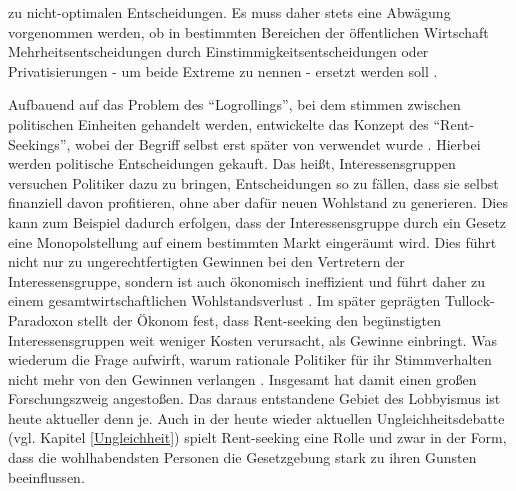 zu nicht-optimalen Entscheidungen. Es muss daher stets eine Abwägung vorgenommen werden, ob in bestimmten Bereichen der öffentlichen Wirtschaft Mehrheitsentscheidungen durch Einstimmigkeitsentscheidungen oder Privatisierungen - um beide Extreme zu nennen - ersetzt werden soll \parencite[S. 172]{Romer1988}.

Aufbauend auf das Problem des "`Logrollings"', bei dem stimmen zwischen politischen Einheiten gehandelt werden, entwickelte \textcite{Tullock1967} das Konzept des "`Rent-Seekings"', wobei der Begriff selbst erst später von \textcite{Krueger1974} verwendet wurde \parencite[S. 231]{Congleton2004}. Hierbei werden politische Entscheidungen gekauft. Das heißt, Interessensgruppen versuchen Politiker dazu zu bringen, Entscheidungen so zu fällen, dass sie selbst finanziell davon profitieren, ohne aber dafür neuen Wohlstand zu generieren. Dies kann zum Beispiel dadurch erfolgen, dass der Interessensgruppe durch ein Gesetz eine Monopolstellung auf einem bestimmten Markt eingeräumt wird. Dies führt nicht nur zu ungerechtfertigten Gewinnen bei den Vertretern der Interessensgruppe, sondern ist auch ökonomisch ineffizient und führt daher zu einem gesamtwirtschaftlichen Wohlstandsverlust \parencite[S. 228]{Tullock1967}. Im später geprägten Tullock-Paradoxon stellt der Ökonom fest, dass Rent-seeking den begünstigten Interessensgruppen weit weniger Kosten verursacht, als Gewinne einbringt. Was wiederum die Frage aufwirft, warum rationale Politiker für ihr Stimmverhalten nicht mehr von den Gewinnen verlangen \parencite[S. 217]{Congleton2004}. Insgesamt hat \textcite{Tullock1967} damit einen großen Forschungszweig angestoßen. Das daraus entstandene Gebiet des Lobbyismus ist heute aktueller denn je. Auch in der heute wieder aktuellen Ungleichheitsdebatte (vgl. Kapitel \ref{Ungleichheit}) spielt Rent-seeking eine Rolle und zwar in der Form, dass die wohlhabendsten Personen die Gesetzgebung stark zu ihren Gunsten beeinflussen.

